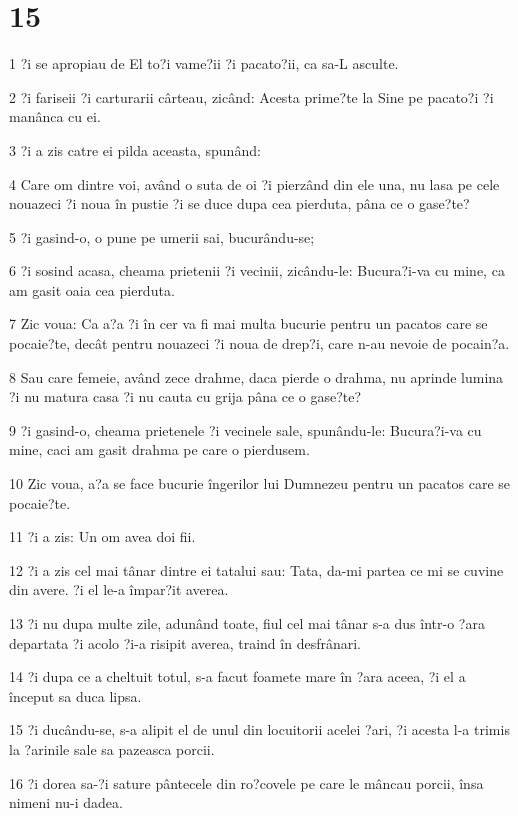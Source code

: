 \chapter{15}

\par 1 ?i se apropiau de El to?i vame?ii ?i pacato?ii, ca sa-L asculte.
\par 2 ?i fariseii ?i carturarii cârteau, zicând: Acesta prime?te la Sine pe pacato?i ?i manânca cu ei.
\par 3 ?i a zis catre ei pilda aceasta, spunând:
\par 4 Care om dintre voi, având o suta de oi ?i pierzând din ele una, nu lasa pe cele nouazeci ?i noua în pustie ?i se duce dupa cea pierduta, pâna ce o gase?te?
\par 5 ?i gasind-o, o pune pe umerii sai, bucurându-se;
\par 6 ?i sosind acasa, cheama prietenii ?i vecinii, zicându-le: Bucura?i-va cu mine, ca am gasit oaia cea pierduta.
\par 7 Zic voua: Ca a?a ?i în cer va fi mai multa bucurie pentru un pacatos care se pocaie?te, decât pentru nouazeci ?i noua de drep?i, care n-au nevoie de pocain?a.
\par 8 Sau care femeie, având zece drahme, daca pierde o drahma, nu aprinde lumina ?i nu matura casa ?i nu cauta cu grija pâna ce o gase?te?
\par 9 ?i gasind-o, cheama prietenele ?i vecinele sale, spunându-le: Bucura?i-va cu mine, caci am gasit drahma pe care o pierdusem.
\par 10 Zic voua, a?a se face bucurie îngerilor lui Dumnezeu pentru un pacatos care se pocaie?te.
\par 11 ?i a zis: Un om avea doi fii.
\par 12 ?i a zis cel mai tânar dintre ei tatalui sau: Tata, da-mi partea ce mi se cuvine din avere. ?i el le-a împar?it averea.
\par 13 ?i nu dupa multe zile, adunând toate, fiul cel mai tânar s-a dus într-o ?ara departata ?i acolo ?i-a risipit averea, traind în desfrânari.
\par 14 ?i dupa ce a cheltuit totul, s-a facut foamete mare în ?ara aceea, ?i el a început sa duca lipsa.
\par 15 ?i ducându-se, s-a alipit el de unul din locuitorii acelei ?ari, ?i acesta l-a trimis la ?arinile sale sa pazeasca porcii.
\par 16 ?i dorea sa-?i sature pântecele din ro?covele pe care le mâncau porcii, însa nimeni nu-i dadea.
